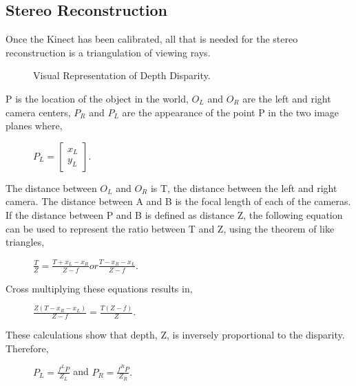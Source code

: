\documentclass[pdftex,10.5pt]{report}
\begin{document}
\subsection{Stereo Reconstruction}
Once the Kinect has been calibrated, all that is needed for the stereo reconstruction is a triangulation of viewing rays.

\begin{figure}[H]
	\centering
	\caption{Visual Representation of Depth Disparity.}
\end{figure}

P is the location of the object in the world, $O_{L}$ and $O_{R}$ are the left and right camera centers, $P_{R}$ and $P_{L}$ are the appearance of the point P in the two image planes where, 
\begin{figure}[H]
	\centering
	 $P_{L}= 
	\begin{bmatrix}
		x_{L} \\
		y_{L} 
	\end{bmatrix}$.
\end{figure}
The distance between $O_{L}$ and $O_{R}$ is T, the distance between the left and right camera. The distance between A and B is the focal length of each of the cameras. If the distance between P and B is defined as distance Z, the following equation  can be used to represent the ratio between T and Z, using the theorem of like triangles,
\begin{figure}[H]
	\centering
	$\frac{T}{Z}=\frac{T+x_{L}-x_{R}}{Z-f} or \frac{T-{x_{R}-x_{L}}}{Z-f}$. 
\end{figure} 
Cross multiplying these equations results in,
\begin{figure}[H]
	\centering
	$\frac{Z(T-x_{R}-x_{L})}{Z-f} = \frac{T(Z-f)}{Z}$. 
\end{figure}
These calculations show that depth, Z, is inversely proportional to the disparity. Therefore,  
\begin{figure}[H]
	\centering
	$P_{L}= \frac{f^{L}P}{Z_{L}} $ and $P_{R}= \frac{f^{R}P}{Z_{R}}.$
\end{figure} 
\end{document}
